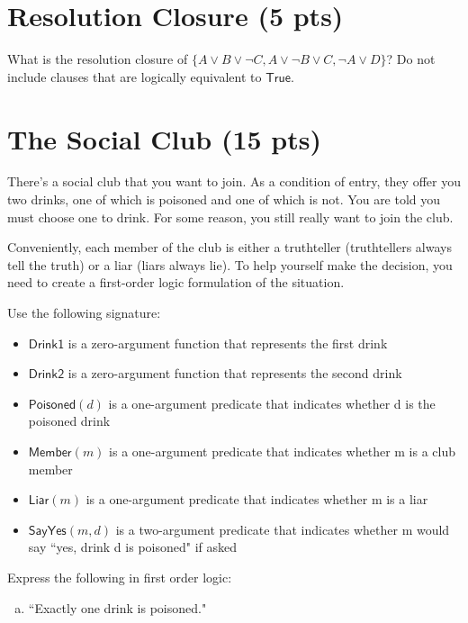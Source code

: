 \documentclass{article}
\begin{document}
\newpage

\section{Resolution Closure (5 pts)}

What is the resolution closure of $\{ A \lor B \lor \lnot C, A \lor \lnot B \lor C, \lnot A \lor D \}$? Do not include clauses that are logically equivalent to $\mathsf{True}$.

\newpage

\section{The Social Club (15 pts)}

There's a social club that you want to join. As a condition of entry, they offer you two drinks, one of which is poisoned and one of which is not. You are told you must choose one to drink. For some reason, you still really want to join the club.

Conveniently, each member of the club is either a truthteller (truthtellers always tell the truth) or a liar (liars always lie). To help yourself make the decision, you need to create a first-order logic formulation of the situation.

Use the following signature:

\begin{itemize}
	\item $\mathsf{Drink1}$ is a zero-argument function that represents the first drink
	\item $\mathsf{Drink2}$ is a zero-argument function that represents the second drink
	\item $\mathsf{Poisoned}(d)$ is a one-argument predicate that indicates whether d is the poisoned drink
	\item $\mathsf{Member}(m)$ is a one-argument predicate that indicates whether m is a club member
	\item $\mathsf{Liar}(m)$ is a one-argument predicate that indicates whether m is a liar
	\item $\mathsf{SayYes}(m, d)$ is a two-argument predicate that indicates whether m would say ``yes, drink d is poisoned" if asked
\end{itemize}

\noindent Express the following in first order logic:

\begin{enumerate}[(a)]
\item ``Exactly one drink is poisoned."
\end{enumerate}
\end{document}
